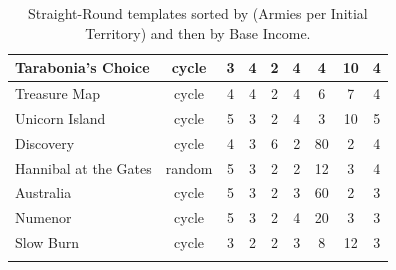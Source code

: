 \begin{longtable}{|l|c|c|c|c|c|c|c|c|}
Tarabonia's Choice           & cycle  & 3 & 4 & 2 & 4 & 4 &10 & 4 \\ \hline
Treasure Map                 & cycle  & 4 & 4 & 2 & 4 & 6 & 7 & 4 \\ \hline \hline \hline
Unicorn Island               & cycle  & 5 & 3 & 2 & 4 & 3 &10 & 5 \\ \hline
Discovery                    & cycle  & 4 & 3 & 6 & 2 & 80 & 2 & 4 \\ \hline
Hannibal at the Gates        & random & 5 & 3 & 2 & 2 & 12 & 3 & 4 \\ \hline
Australia                    & cycle  & 5 & 3 & 2 & 3 & 60 & 2 & 3 \\ \hline
Numenor                      & cycle  & 5 & 3 & 2 & 4 & 20 & 3 & 3 \\ \hline \hline \hline
Slow Burn                    & cycle  & 3 & 2 & 2 & 3 & 8  &12 & 3 \\ \hline
\caption{Straight-Round templates sorted by (Armies per Initial Territory) and then by Base Income.}
\label{table:sr_opening_sorted}
\end{longtable}
\normalsize

